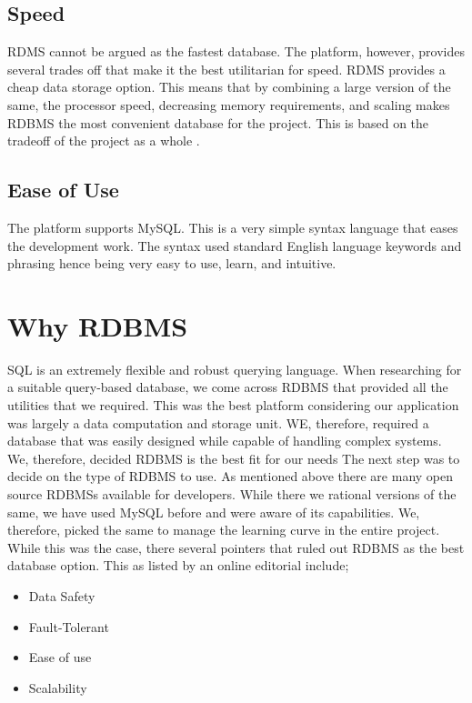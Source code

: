 \subsection{Speed}

RDMS cannot be argued as the fastest database. The platform, however, provides several trades off that make it the best utilitarian for speed. RDMS provides a cheap data storage option. This means that by combining a large version of the same, the processor speed, decreasing memory requirements, and scaling makes RDBMS the most convenient database for the project. This is based on the tradeoff of the project as a whole \cite{ADB}.

\subsection{Ease of Use}
The platform supports MySQL. This is a very simple syntax language that eases the development work. The syntax used standard English language keywords and phrasing hence being very easy to use, learn, and intuitive. 

\section{Why RDBMS}

SQL is an extremely flexible and robust querying language. When researching for a suitable query-based database, we come across RDBMS that provided all the utilities that we required. This was the best platform considering our application was largely a data computation and storage unit. WE, therefore, required a database that was easily designed while capable of handling complex systems. We, therefore, decided RDBMS is the best fit for our needs
\newline
\newline
The next step was to decide on the type of RDBMS to use. As mentioned above there are many open source RDBMSs available for developers.  While there we rational versions of the same, we have used MySQL before and were aware of its capabilities. We, therefore, picked the same to manage the learning curve in the entire project.
\newline
\newline
While this was the case, there several pointers that ruled out RDBMS as the best database option. This as listed by an online editorial include; 

\begin{itemize}
    \item Data Safety
    \item Fault-Tolerant 
    \item Ease of use
    \item Scalability 
\end{itemize}


